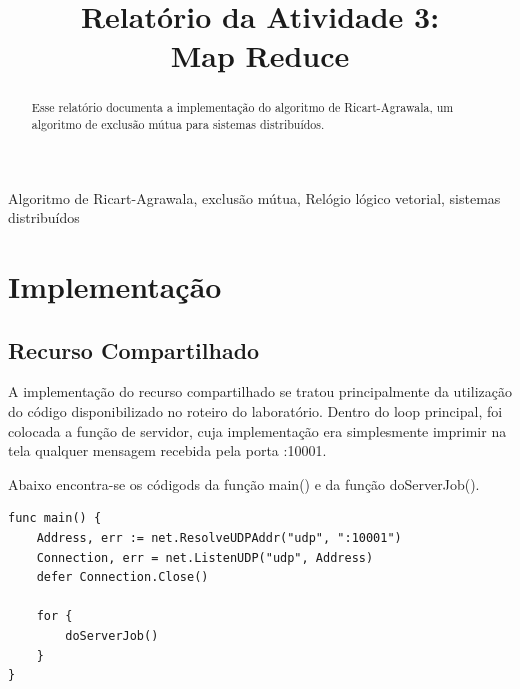 \documentclass[conference]{IEEEtran}
\begin{document}
\title{Relatório da Atividade 3: \\ Map Reduce\\
}

\author{
}

\maketitle

\begin{abstract}
Esse relatório documenta a implementação do algoritmo de Ricart-Agrawala, um algoritmo de exclusão mútua para sistemas distribuídos.
\end{abstract}

\begin{IEEEkeywords}
Algoritmo de Ricart-Agrawala, exclusão mútua, Relógio lógico vetorial, sistemas distribuídos
\end{IEEEkeywords}

\section{Implementação}

\subsection{Recurso Compartilhado}
	
	A implementação do recurso compartilhado se tratou principalmente da utilização do código disponibilizado no roteiro do laboratório. Dentro do loop principal, foi colocada a função de servidor, cuja implementação era simplesmente imprimir na tela qualquer mensagem recebida pela porta :10001.
	
	Abaixo encontra-se os códigods da função main() e da função doServerJob().
	
\begin{lstlisting}
func main() {
	Address, err := net.ResolveUDPAddr("udp", ":10001")
	Connection, err = net.ListenUDP("udp", Address)
	defer Connection.Close()

	for {
		doServerJob()
	}
}
\end{lstlisting}
\end{document}
